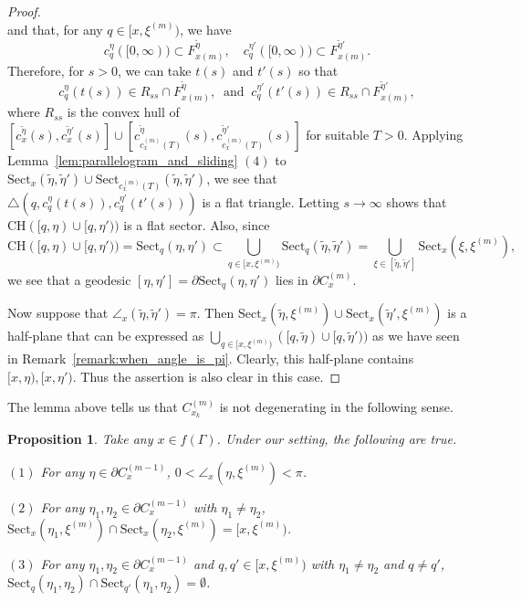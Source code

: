 \documentclass[12pt]{amsart}
\numberwithin{equation}{section}
\theoremstyle{plain}
\newtheorem{Proposition}[Theorem]{Proposition}
\theoremstyle{definition}
\theoremstyle{remark}
\newcommand{\xxi}[1]{\xi^{(#1)}}
\newcommand{\ray}[1]{[#1)}
\newcommand{\cc}[2]{c_{#1}^{#2}}
\newcommand{\tri}[3]{\triangle(#1,#2,#3)}
\newcommand{\ch}[1]{\mathrm{CH}(#1)}
\newcommand{\sect}[3][]{\mathrm{Sect}_{#1}(#2,#3)}
\newcommand{\cone}[2][]{C_{#1}^{(#2)}}
\begin{document}
\begin{proof}
\begin{equation*}
\end{equation*} 
 and that, for any $q \in [x,\xxi{m})$, we have
\begin{equation*}
  c_q^{\eta}(\ray{0,\infty}) \subset F_{x (m)}^{\tilde\eta}, \quad
  c_q^{\eta'}(\ray{0,\infty}) \subset F_{x (m)}^{\tilde\eta'}. 
\end{equation*}
 Therefore, for $s>0$, 
 we can take $t(s)$ and $t'(s)$ so that
\begin{equation*}
  \cc{q}{\eta}(t(s)) \in R_{ss} \cap F_{x (m)}^{\tilde\eta}, 
 \ \text{ and }\ 
  \cc{q}{\eta'}(t'(s)) \in R_{ss} \cap F_{x (m)}^{\tilde\eta'}, 
\end{equation*} 
 where $R_{ss}$ is the convex hull of 
 $[\cc{x}{\tilde\eta}(s),\cc{x}{\tilde\eta'}(s)] \cup 
  [\cc{\cc{x}{(m)}(T)}{\tilde\eta}(s),\cc{\cc{x}{(m)}(T)}{\tilde\eta'}(s)]$ 
 for suitable $T>0$.
 Applying Lemma~\ref{lem:parallelogram_and_sliding} $(4)$ to 
 $\sect[x]{\tilde\eta}{\tilde\eta'} \cup 
 \sect[\cc{x}{(m)}(T)]{\tilde\eta}{\tilde\eta'}$, 
 we see that $\tri{q}{c_q^{\eta}(t(s))}{c_q^{\eta'}(t'(s))}$ is a flat
 triangle. 
 Letting $s \to \infty$ shows that $\ch{\ray{q,\eta}\cup \ray{q,\eta'}}$
 is a flat sector. 
 Also, since 
\begin{equation*}
  \ch{\ray{q,\eta}\cup \ray{q,\eta'}} 
  = \sect[q]{\eta}{\eta'} \subset 
 \bigcup_{q \in \ray{x,\xxi{m}}}\sect[q]{\tilde\eta}{\tilde\eta'}
 = \bigcup_{\xi \in [\tilde\eta,\tilde\eta']} \sect[x]{\xi}{\xxi{m}}, 
\end{equation*} 
 we see that a geodesic 
 $[\eta,\eta']=\partial\sect[q]{\eta}{\eta'}$ lies in
 $\partial\cone[x]{m}$. 

 Now suppose that $\angle_{x}(\tilde\eta,\tilde\eta')=\pi$.  
 Then
  $\sect[x]{\tilde\eta}{\xxi{m}}\cup \sect[x]{\tilde\eta'}{\xxi{m}}$
 is a half-plane that can be expressed as 
 $\bigcup_{q \in \ray{x,\xxi{m}}} 
 (\ray{q,\tilde\eta}\cup \ray{q,\tilde\eta'})$
 as we have seen in Remark~\ref{remark:when_angle_is_pi}. 
 Clearly, this half-plane contains $\ray{x,\eta}, \ray{x,\eta'}$. 
 Thus the assertion is also clear in this case.
\end{proof}

%
%
 The lemma above tells us that $\cone[x_k]{m}$ is not degenerating in
 the following sense. 

\begin{Proposition}
 \label{prop:less_than_pi}
 Take any $x\in f(\Gamma)$. 
 Under our setting, the following are true. 

 $(1)$ For any $\eta \in \partial \cone[x]{m-1}$, 
 $0<\angle_{x}(\eta,\xxi{m}) < \pi$. 

 $(2)$ For any $\eta_1, \eta_2 \in \partial \cone[x]{m-1}$ with
 $\eta_1\not=\eta_2$, 
 $\sect[x]{\eta_1}{\xxi{m}}\cap\sect[x]{\eta_2}{\xxi{m}}
 =\ray{x,\xxi{m}}$.

 $(3)$ For any $\eta_1, \eta_2 \in \partial \cone[x]{m-1}$ and 
 $q,q' \in \ray{x,\xxi{m}}$ with $\eta_1\not= \eta_2$ and 
 $q\not=q'$, 
 $\sect[q]{\eta_1}{\eta_2} \cap \sect[q']{\eta_1}{\eta_2}=\emptyset$. 
\end{Proposition}
\end{document}
